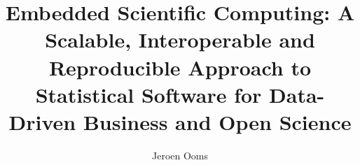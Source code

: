 \documentclass[PhD]{uclathes}\usepackage[]{graphicx}\usepackage[]{color}
\title{Embedded Scientific Computing: A Scalable, Interoperable and Reproducible Approach to Statistical Software for Data-Driven Business and Open Science}
\author{Jeroen Ooms}
\begin{document}
\makeintropages












\end{document}
